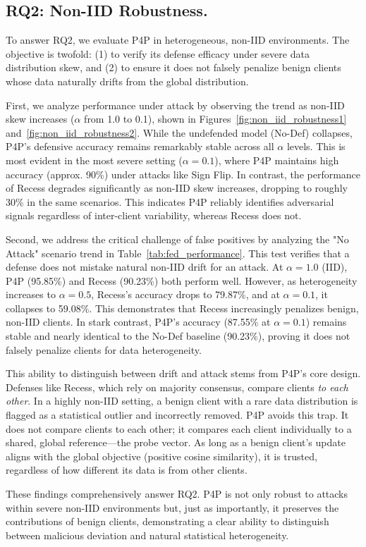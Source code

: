 \subsection{RQ2: Non-IID Robustness.}
\label{sec:rq2}

To answer RQ2, we evaluate P4P in heterogeneous, non-IID environments. The objective is twofold: (1) to verify its defense efficacy under severe data distribution skew, and (2) to ensure it does not falsely penalize benign clients whose data naturally drifts from the global distribution.

First, we analyze performance under attack by observing the trend as non-IID skew increases ($\alpha$ from 1.0 to 0.1), shown in Figures~\ref{fig:non_iid_robustness1} and~\ref{fig:non_iid_robustness2}. While the undefended model (No-Def) collapses, P4P's defensive accuracy remains remarkably stable across all $\alpha$ levels. This is most evident in the most severe setting ($\alpha=0.1$), where P4P maintains high accuracy (approx. 90\%) under attacks like Sign Flip. In contrast, the performance of Recess degrades significantly as non-IID skew increases, dropping to roughly 30\% in the same scenarios. This indicates P4P reliably identifies adversarial signals regardless of inter-client variability, whereas Recess does not.

Second, we address the critical challenge of false positives by analyzing the "No Attack" scenario trend in Table~\ref{tab:fed_performance}. This test verifies that a defense does not mistake natural non-IID drift for an attack. At $\alpha=1.0$ (IID), P4P (95.85\%) and Recess (90.23\%) both perform well. However, as heterogeneity increases to $\alpha=0.5$, Recess's accuracy drops to 79.87\%, and at $\alpha=0.1$, it collapses to 59.08\%. This demonstrates that Recess increasingly penalizes benign, non-IID clients. In stark contrast, P4P's accuracy (87.55\% at $\alpha=0.1$) remains stable and nearly identical to the No-Def baseline (90.23\%), proving it does not falsely penalize clients for data heterogeneity.

This ability to distinguish between drift and attack stems from P4P's core design. Defenses like Recess, which rely on majority consensus, compare clients \textit{to each other}. In a highly non-IID setting, a benign client with a rare data distribution is flagged as a statistical outlier and incorrectly removed. P4P avoids this trap. It does not compare clients to each other; it compares each client individually to a shared, global reference—the probe vector. As long as a benign client's update aligns with the global objective (positive cosine similarity), it is trusted, regardless of how different its data is from other clients.

These findings comprehensively answer RQ2. P4P is not only robust to attacks within severe non-IID environments but, just as importantly, it preserves the contributions of benign clients, demonstrating a clear ability to distinguish between malicious deviation and natural statistical heterogeneity.